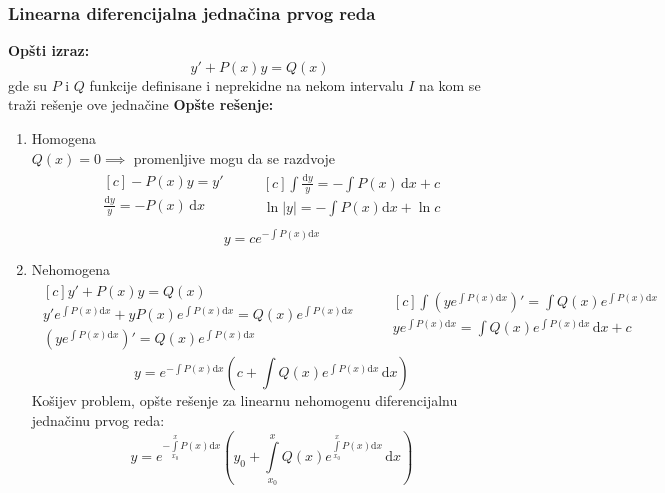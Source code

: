 \subsubsection{Linearna diferencijalna jednačina prvog reda}
\textbf{Opšti izraz:}
$$y'+P(x)y=Q(x)$$
gde su $P$ i $Q$ funkcije definisane i neprekidne na nekom intervalu $I$ na kom se traži rešenje ove jednačine
\textbf{Opšte rešenje:}
\begin{enumerate}[label = \alph*)]
	\item 
		Homogena\\
		$Q(x) = 0 \implies$ promenljive mogu da se razdvoje
		\begin{align*}
			\begin{aligned}[c]
				-P(x)y=y'\\
				\frac{\mathrm{d}y}{y} = -P(x)\,\mathrm{d}x\\
			\end{aligned}
			\quad \quad
			\begin{aligned}[c]
				\int \frac{\mathrm{d}y}{y} = - \int P(x)\,\mathrm{d}x+c\\
				\ln|y| = -\int P(x)\mathrm{d}x+\ln c\\	
			\end{aligned}
		\end{align*}
		$$y = ce^{-\int P(x) \mathrm{d}x}$$
	\item
		Nehomogena\\
		\begin{align*}
			\begin{aligned}[c]
				y'+P(x)y=Q(x)\\
				y'e^{\int P(x)\mathrm{d}x} + yP(x)e^{\int P(x)\mathrm{d}x} = Q(x)e^{\int P(x)\mathrm{d}x}\\
				\left(ye^{\int P(x)\mathrm{d}x}\right)'=Q(x)e^{\int P(x)\mathrm{d}x}
			\end{aligned}
			\quad \quad
			\begin{aligned}[c]
				\int\left(ye^{\int P(x)\mathrm{d}x}\right)'=\int Q(x)e^{\int P(x)\mathrm{d}x}\\
				ye^{\int P(x)\mathrm{d}x} = \int Q(x)e^{\int P(x)\mathrm{d}x}\,\mathrm{d}x +c\\
			\end{aligned}
		\end{align*}
		$$y = e^{-\int P(x)\mathrm{d}x}\left(c+ \int Q(x)e^{\int P(x)\mathrm{d}x} \,\mathrm{d}x \right)$$
		Košijev problem, opšte rešenje za linearnu nehomogenu diferencijalnu jednačinu prvog reda:
		$$y = e^{-\int\limits^x_{x_0} P(x)\mathrm{d}x}\left(y_0+ \int\limits^x_{x_0} Q(x)e^{\int\limits^x_{x_0} P(x)\mathrm{d}x} \, \mathrm{d}x \right)$$
\end{enumerate}

